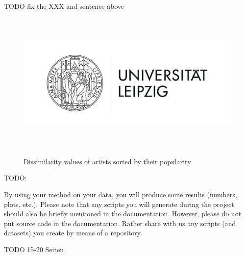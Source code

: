 TODO fix the XXX and sentence above

\begin{figure}[h]
    \begin{center}
        \includegraphics[height=7cm]{Bilder/ranked_artist_dissimilarity.png}\\[2.5ex]
    \end{center}
\caption{Dissimilarity values of artists sorted by their popularity}
\end{figure}






TODO:

By using your method on your data, you will produce some
results (numbers, plots, etc.). Please note that any scripts
you will generate during the project should also be briefly
mentioned in the documentation. However, please do not
put source code in the documentation. Rather share with
us any scripts (and datasets) you create by means of a
repository.

TODO 15-20 Seiten

